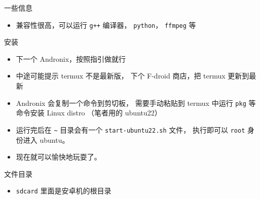 
一些信息
\begin{itemize}
\item 兼容性很高，可以运行 \verb`g++` 编译器， \verb`python`， \verb`ffmpeg` 等
\end{itemize}


安装
\begin{itemize}
\item 下一个 Andronix，按照指引做就行
\item 中途可能提示 termux 不是最新版， 下个 F-droid 商店，把 termux 更新到最新
\item Andronix 会复制一个命令到剪切板， 需要手动粘贴到 termux 中运行 \verb`pkg` 等命令安装 Linux distro （笔者用的 ubuntu22）
\item 运行完后在 \verb`~` 目录会有一个 \verb`start-ubuntu22.sh` 文件， 执行即可以 \verb`root` 身份进入 ubuntu。
\item 现在就可以愉快地玩耍了。
\end{itemize}


文件目录
\begin{itemize}
\item \verb`sdcard` 里面是安卓机的根目录
\end{itemize}

